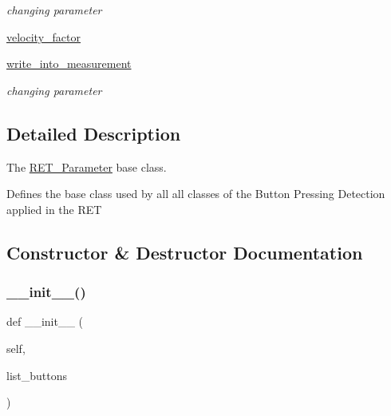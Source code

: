 \begin{DoxyCompactItemize}
\begin{DoxyCompactList}\small\item\em changing parameter \end{DoxyCompactList}\item 
\hyperlink{a00037_a082e6ba9804a6094336b4c267262460e}{velocity\+\_\+factor}
\item 
\hyperlink{a00037_ab7ecf57e4e15355326fd625e3a331cc7}{write\+\_\+into\+\_\+measurement}
\begin{DoxyCompactList}\small\item\em changing parameter \end{DoxyCompactList}\end{DoxyCompactItemize}


\subsection{Detailed Description}
The \hyperlink{a00037}{R\+E\+T\+\_\+\+Parameter} base class. 

Defines the base class used by all all classes of the Button Pressing Detection applied in the R\+ET 

\subsection{Constructor \& Destructor Documentation}
\mbox{\label{a00037_ae2ab6faaa5ceb4d95a632635b03d437d}} 
\subsubsection{\texorpdfstring{\+\_\+\+\_\+init\+\_\+\+\_\+()}{\_\_init\_\_()}}
{\footnotesize\ttfamily def \+\_\+\+\_\+init\+\_\+\+\_\+ (\begin{DoxyParamCaption}\item[{}]{self,  }\item[{}]{list\+\_\+buttons }\end{DoxyParamCaption})}



